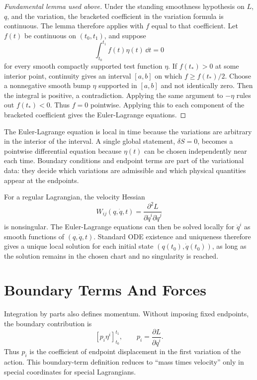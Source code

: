 \begin{proof}[Fundamental lemma used above]
Under the standing smoothness hypothesis on \(L\), \(q\), and the variation,
the bracketed coefficient in the variation formula is continuous. The lemma
therefore applies with \(f\) equal to that coefficient. Let \(f(t)\) be
continuous on \((t_0,t_1)\), and suppose
\[
  \int_{t_0}^{t_1} f(t)\eta(t)\,\dd t=0
\]
for every smooth compactly supported test function \(\eta\). If \(f(t_*)>0\)
at some interior point, continuity gives an interval \([a,b]\) on which
\(f\ge f(t_*)/2\). Choose a nonnegative smooth bump \(\eta\) supported in
\([a,b]\) and not identically zero. Then the integral is positive, a
contradiction. Applying the same argument to \(-\eta\) rules out \(f(t_*)<0\).
Thus \(f=0\) pointwise. Applying this to each component of the bracketed
coefficient gives the Euler-Lagrange equations.
\end{proof}

The Euler-Lagrange equation is local in time because the variations are
arbitrary in the interior of the interval. A single global statement,
\(\delta S=0\), becomes a pointwise differential equation because
\(\eta(t)\) can be chosen independently near each time. Boundary conditions and
endpoint terms are part of the variational data: they decide which variations
are admissible and which physical quantities appear at the endpoints.

For a regular Lagrangian, the velocity Hessian
\[
  W_{ij}(q,\dot q,t)
  =
  \frac{\partial^2L}{\partial\dot q^i\partial\dot q^j}
\]
is nonsingular. The Euler-Lagrange equations can then be solved locally for
\(\ddot q^i\) as smooth functions of \((q,\dot q,t)\). Standard ODE existence
and uniqueness therefore gives a unique local solution for each initial state
\((q(t_0),\dot q(t_0))\), as long as the solution remains in the chosen chart
and no singularity is reached.

\section{Boundary Terms And Forces}
\label{sec:boundary-forces}

Integration by parts also defines momentum. Without imposing fixed endpoints,
the boundary contribution is
\[
  \left[p_i\eta^i\right]_{t_0}^{t_1},
  \qquad
  p_i=\frac{\partial L}{\partial \dot q^i}.
\]
Thus \(p_i\) is the coefficient of endpoint displacement in the first variation
of the action. This boundary-term definition reduces to ``mass times velocity''
only in special coordinates for special Lagrangians.

